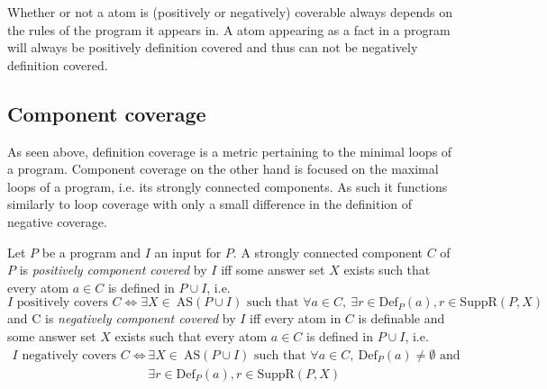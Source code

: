 Whether or not a atom is (positively or negatively) coverable always depends on the rules of the program it appears in. A atom appearing as a fact in a program will always be positively definition covered and thus can not be negatively definition covered.

\subsection{Component coverage}
\label{subsec:Coverage cetrics/Branch-like coverage/Component coverage}
As seen above, definition coverage is a metric pertaining to the minimal loops of a program. Component coverage on the other hand is focused on the maximal loops of a program, i.e. its strongly connected components. As such it functions similarly to loop coverage with only a small difference in the definition of negative coverage.

\begin{definition}
\label{def:component coverage}
    Let $P$ be a program and $I$ an input for $P$. A strongly connected component $C$ of $P$ is \emph{positively component covered} by $I$ iff some answer set $X$ exists such that every atom \(a \in C\) is defined in \(P \cup I\), i.e.
    \[
        I \text{ positively covers } C \Longleftrightarrow \exists X \in\ \text{AS}(P \cup I) \text{ such that } \forall a \in C,\ \exists r \in \text{Def}_P(a), r \in \text{SuppR}(P,X)
    \]
    and C is \emph{negatively component covered} by $I$ iff every atom in $C$ is definable and some answer set $X$ exists such that every atom \(a \in C\) is defined in \(P \cup I\), i.e.
    \begin{align*}
        I \text{ negatively covers } C \Longleftrightarrow &\exists X \in\ \text{AS}(P \cup I) \text{ such that } \forall a \in C,\ \text{Def}_P(a) \neq \emptyset \text{ and } \\
        &\exists r \in \text{Def}_P(a), r \in \text{SuppR}(P,X)
    \end{align*}
\end{definition}

